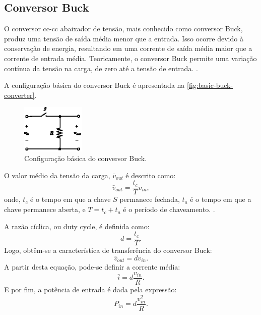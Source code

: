 \subsection{Conversor Buck} \label{section:buck_converter}

O conversor \acrshort{cc}-\acrshort{cc} abaixador de tensão, mais conhecido como conversor Buck, produz uma tensão de saída média menor que a entrada. Isso ocorre devido à conservação de energia, resultando em uma corrente de saída média maior que a corrente de entrada média. Teoricamente, o conversor Buck permite uma variação contínua da tensão na carga, de zero até a tensão de entrada. \cite{martins2008}.

A configuração básica do conversor Buck é apresentada na \autoref{fig:basic-buck-converter}.

\begin{figure}[H]
  \centering
  \includegraphics[width=0.27\textwidth]{figuras/basic_buck_conversor.eps}
  \caption{Configuração básica do conversor Buck.}
  \label{fig:basic-buck-converter}
\end{figure}

O valor médio da tensão da carga, $\bar{v}_{out}$ é descrito como: \begin{equation} \bar{v}_{out} = \frac{t_c}{T}v_{in}, \end{equation} onde, $t_c$ é o tempo em que a chave $S$ permanece fechada, $t_a$ é o tempo em que a chave permanece aberta, e $T = t_c + t_a$ é o período de chaveamento. \cite{martins2008}.

A razão cíclica, ou duty cycle, é definida como: \begin{equation} d = \frac{t_c}{T}. \end{equation} Logo, obtêm-se a característica de transferência do conversor Buck: \begin{equation} \bar{v}_{out} = dv_{in}. \label{eq:buck_feature}\end{equation} A partir desta equação, pode-se definir a corrente média: \begin{equation} \bar{i} = d\frac{v_{in}}{R}. \end{equation} E por fim, a potência de entrada é dada pela expressão: \begin{equation} P_{in} = d \frac{v_{in}^2}{R}. \end{equation}

